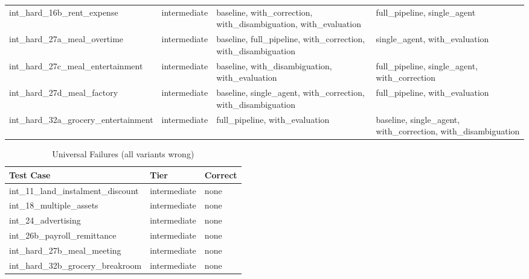 \begin{table}[htbp]
{\begin{tabular}{l l l l}
  int\_hard\_16b\_rent\_expense & intermediate & baseline, with\_correction, with\_disambiguation, with\_evaluation & full\_pipeline, single\_agent \\
  int\_hard\_27a\_meal\_overtime & intermediate & baseline, full\_pipeline, with\_correction, with\_disambiguation & single\_agent, with\_evaluation \\
  int\_hard\_27c\_meal\_entertainment & intermediate & baseline, with\_disambiguation, with\_evaluation & full\_pipeline, single\_agent, with\_correction \\
  int\_hard\_27d\_meal\_factory & intermediate & baseline, single\_agent, with\_correction, with\_disambiguation & full\_pipeline, with\_evaluation \\
  int\_hard\_32a\_grocery\_entertainment & intermediate & full\_pipeline, with\_evaluation & baseline, single\_agent, with\_correction, with\_disambiguation \\
\bottomrule
\end{tabular}}\end{table}

\begin{table}[htbp]
\centering
\caption{Universal Failures (all variants wrong)}
\label{tab:all-fail}
\begin{tabular}{l l l}
\toprule
Test Case & Tier & Correct \\
\midrule
  int\_11\_land\_instalment\_discount & intermediate & none \\
  int\_18\_multiple\_assets & intermediate & none \\
  int\_24\_advertising & intermediate & none \\
  int\_26b\_payroll\_remittance & intermediate & none \\
  int\_hard\_27b\_meal\_meeting & intermediate & none \\
  int\_hard\_32b\_grocery\_breakroom & intermediate & none \\
\bottomrule
\end{tabular}
\end{table}
